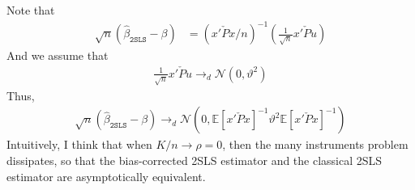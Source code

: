 \documentclass[12pt]{article}
\newcommand{\E}{\mathbb{E}}
\newcommand{\mtx}[1]{\ensuremath{\bm{\mathit{#1}}}}
\newcommand{\N}{\mathcal{N}}
\begin{document}
\subsubsection{}
Note that
\begin{align*}
\sqrt{n}(\hat\beta_{\texttt{2SLS}} - \beta) &= (\mtx{x}'\check{\mtx{P}}\mtx{x}/n)^{-1}(\frac{1}{\sqrt{n}}\mtx{x}'\check{\mtx{P}}\mtx{u})
\end{align*}
And we assume that
\begin{align*}
\frac{1}{\sqrt{n}}\mtx{x}'\check{\mtx{P}}\mtx{u} \to_d \N(0, \vartheta^2)
\end{align*}
Thus,
\begin{align*}
\sqrt{n}(\hat\beta_{\texttt{2SLS}} - \beta) \to_d \N(0, \E[\mtx{x}'\check{\mtx{P}}\mtx{x}]^{-1}\vartheta^2\E[\mtx{x}'\check{\mtx{P}}\mtx{x}]^{-1})
\end{align*}
Intuitively, I think that when $K/n \to \rho = 0$, then the many instruments problem dissipates, so that the bias-corrected 2SLS estimator and the classical 2SLS estimator are asymptotically equivalent.
\end{document}

